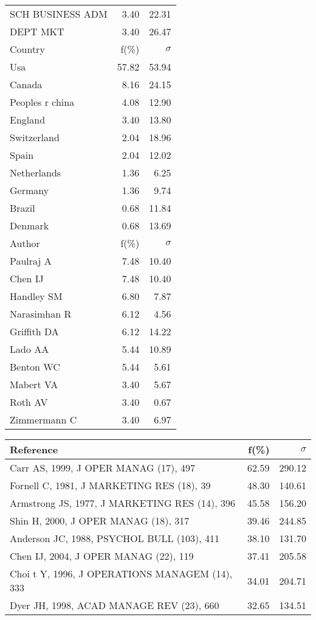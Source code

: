 \documentclass[a4paper,11pt]{report}
\begin{document}
\begin{landscape}
\begin{table}[!ht]
{\begin{tabular}{|l r r|}
SCH BUSINESS ADM & 3.40 & 22.31\\
DEPT MKT & 3.40 & 26.47\\
\hline
\hline
Country & f(\%) & $\sigma$\\
\hline
Usa & 57.82 & 53.94\\
Canada & 8.16 & 24.15\\
Peoples r china & 4.08 & 12.90\\
England & 3.40 & 13.80\\
Switzerland & 2.04 & 18.96\\
Spain & 2.04 & 12.02\\
Netherlands & 1.36 & 6.25\\
Germany & 1.36 & 9.74\\
Brazil & 0.68 & 11.84\\
Denmark & 0.68 & 13.69\\
\hline
\hline
Author & f(\%) & $\sigma$\\
\hline
Paulraj A & 7.48 & 10.40\\
Chen IJ & 7.48 & 10.40\\
Handley SM & 6.80 & 7.87\\
Narasimhan R & 6.12 & 4.56\\
Griffith DA & 6.12 & 14.22\\
Lado AA & 5.44 & 10.89\\
Benton WC & 5.44 & 5.61\\
Mabert VA & 3.40 & 5.67\\
Roth AV & 3.40 & 0.67\\
Zimmermann C & 3.40 & 6.97\\
\hline
\end{tabular}
}
{\scriptsize\begin{tabular}{|l r r|}
\hline
Reference & f(\%) & $\sigma$\\
\hline
Carr AS, 1999, J OPER MANAG (17), 497 & 62.59 & 290.12\\
Fornell C, 1981, J MARKETING RES (18), 39 & 48.30 & 140.61\\
Armstrong JS, 1977, J MARKETING RES (14), 396 & 45.58 & 156.20\\
Shin H, 2000, J OPER MANAG (18), 317 & 39.46 & 244.85\\
Anderson JC, 1988, PSYCHOL BULL (103), 411 & 38.10 & 131.70\\
Chen IJ, 2004, J OPER MANAG (22), 119 & 37.41 & 205.58\\
Choi t Y, 1996, J OPERATIONS MANAGEM (14), 333 & 34.01 & 204.71\\
Dyer JH, 1998, ACAD MANAGE REV (23), 660 & 32.65 & 134.51\\

\end{tabular}}
\end{table}
\end{landscape}
\end{document}
